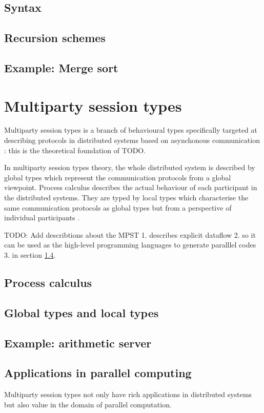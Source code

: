 \subsection{Syntax}
\subsection{Recursion schemes}
\subsection{Example: Merge sort}
\section{Multiparty session types} \label{b:mpst}
Multiparty session types is a branch of behavioural types specifically targeted at describing protocols in distributed systems based on asynchonous communication \cite{coppoGentleIntroductionMultiparty2015}: this is the theoretical foundation of TODO.

In multiparty session types theory, the whole distributed system is described by global types which represent the communication protocols from a global viewpoint. Process calculus describes the actual behaviour of each participant in the distributed systems. They are typed by local types which characterise the same communication protocols as global types but from a perspective of individual participants \cite{coppoGentleIntroductionMultiparty2015}.

TODO: Add describtions about the MPST 1. describes explicit dataflow 2. so it can be used as the high-level programming languages to generate paralllel codes 3. in section \ref{b:mpst:app}.
\subsection{Process calculus}
\subsection{Global types and local types}
\subsection{Example: arithmetic server}
\subsection{Applications in parallel computing} \label{b:mpst:app}
Multiparty session types not only have rich applications in distributed systems but also value in the domain of parallel computation. 

